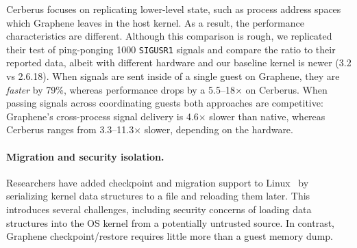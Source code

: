 Cerberus focuses on replicating lower-level state, such as process address spaces
which Graphene leaves in the host kernel.
As a result, the performance characteristics are different.
Although this comparison is rough, 
we replicated their test of ping-ponging 1000 
{\tt SIGUSR1} signals and compare the ratio to their reported data, 
albeit with different hardware and our baseline kernel is newer 
(3.2 vs 2.6.18).  
When signals are sent inside of a single guest on Graphene, they are {\em faster}
by 79\%, whereas performance drops by a 5.5--18$\times$ on Cerberus.
When passing signals across coordinating guests both approaches are competitive:
Graphene's cross-process signal delivery is 4.6$\times$ slower than native, whereas Cerberus ranges from 
3.3--11.3$\times$ slower, depending on the hardware.



\paragraph{Migration and security isolation.}
Researchers have added checkpoint and migration support to Linux~\citep{linux-cr}
by serializing kernel data structures to a file
and reloading them later.  
This introduces several challenges, including
security concerns of loading data structures into the OS kernel from a potentially 
untrusted source.
In contrast, Graphene checkpoint/restore 
requires little more than a guest memory dump.



